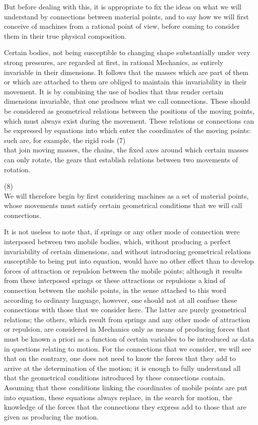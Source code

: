 \documentclass{book}
\begin{document}
But before dealing with this, it is appropriate to fix the ideas on what we will understand by connections between material points, and to say how we will first conceive of machines from a rational point of view, before coming to consider them in their true physical composition.

Certain bodies, not being susceptible to changing shape substantially under very strong pressures, are regarded at first, in rational Mechanics, as entirely invariable in their dimensions. It follows that the masses which are part of them or which are attached to them are obliged to maintain this invariability in their movement. It is by combining the use of bodies that thus render certain dimensions invariable, that one produces what we call connections. These should be considered as geometrical relations between the positions of the moving points, which must always exist during the movement. These relations or connections can be expressed by equations into which enter the coordinates of the moving points: such are, for example, the rigid rods 
\newpage
(7) \\
that join moving masses, the chains, the fixed axes around which certain masses can only rotate, the gears that establish relations between two movements of rotation.

\newpage
(8)\\
We will therefore begin by first considering machines as a set of material points, whose movements must satisfy certain geometrical conditions that we will call connections.

It is not useless to note that, if springs or any other mode of connection were interposed between two mobile bodies, which, without producing a perfect invariability of certain dimensions, and without introducing geometrical relations susceptible to being put into equation, would have no other effect than to develop forces of attraction or repulsion between the mobile points; although it results from these interposed springs or these attractions or repulsions a kind of connection between the mobile points, in the sense attached to this word according to ordinary language, however, one should not at all confuse these connections with those that we consider here. The latter are purely geometrical relations; the others, which result from springs and any other mode of attraction or repulsion, are considered in Mechanics only as means of producing forces that must be known a priori as a function of certain variables to be introduced as data in questions relating to motion. For the connections that we consider, we will see that on the contrary, one does not need to know the forces that they add to arrive at the determination of the motion; it is enough to fully understand all that the geometrical conditions introduced by these connections contain. Assuming that these conditions linking the coordinates of mobile points are put into equation, these equations always replace, in the search for motion, the knowledge of the forces that the connections they express add to those that are given as producing the motion.
\end{document}
